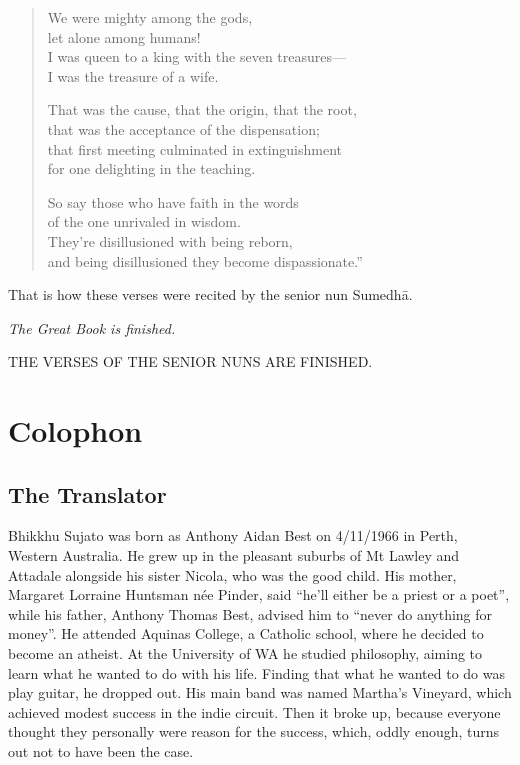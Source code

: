 \documentclass[12pt,openany]{book}%
\newcommand*{\scendsection}[1]{\begin{center}\textit{#1}\end{center}}
\newcommand*{\scendbook}[1]{\begin{center}\uppercase{#1}\end{center}}
\let\oldbackmatter\backmatter
\renewcommand{\backmatter}{%
\chapterfont{\setstretch{.85}\normalfont\centering}%
\sectionfont{\setstretch{.85}\Semiboldsubheadfont}%
\oldbackmatter}
\begin{document}
\begin{verse}
We were mighty among the gods, \\
let alone among humans! \\
I was queen to a king with the seven treasures—\\
I was the treasure of a wife. 

That was the cause, that the origin, that the root, \\
that was the acceptance of the dispensation; \\
that first meeting culminated in extinguishment \\
for one delighting in the teaching. 

So say those who have faith in the words \\
of the one unrivaled in wisdom. \\
They’re disillusioned with being reborn, \\
and being disillusioned they become dispassionate.” 

%
\end{verse}

That is how these verses were recited by the senior nun \textsanskrit{Sumedhā}. 

\scendsection{The Great Book is finished. }

\scendbook{The Verses of the Senior Nuns are finished. }

%
\backmatter%
\chapter*{Colophon}

\section*{The Translator}

Bhikkhu Sujato was born as Anthony Aidan Best on 4/11/1966 in Perth, Western Australia. He grew up in the pleasant suburbs of Mt Lawley and Attadale alongside his sister Nicola, who was the good child. His mother, Margaret Lorraine Huntsman née Pinder, said “he’ll either be a priest or a poet”, while his father, Anthony Thomas Best, advised him to “never do anything for money”. He attended Aquinas College, a Catholic school, where he decided to become an atheist. At the University of WA he studied philosophy, aiming to learn what he wanted to do with his life. Finding that what he wanted to do was play guitar, he dropped out. His main band was named Martha’s Vineyard, which achieved modest success in the indie circuit. Then it broke up, because everyone thought they personally were reason for the success, which, oddly enough, turns out not to have been the case. 
\end{document}
